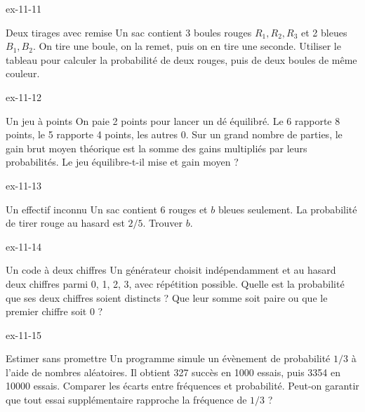 \clearpage{}
\begin{blocLivre}{ex-11-11}\begin{exercice}[3]{Deux tirages avec remise}
Un sac contient 3 boules rouges $R_1,R_2,R_3$ et 2 bleues $B_1,B_2$. On tire une boule, on la remet, puis on en tire une seconde. Utiliser le tableau pour calculer la probabilité de deux rouges, puis de deux boules de même couleur.
\label{fig-ex-11-11}
\end{exercice}\end{blocLivre}
\begin{blocLivre}{ex-11-12}\begin{exercice}[3]{Un jeu à points}
On paie 2 points pour lancer un dé équilibré. Le 6 rapporte 8 points, le 5 rapporte 4 points, les autres 0. Sur un grand nombre de parties, le gain brut moyen théorique est la somme des gains multipliés par leurs probabilités. Le jeu équilibre-t-il mise et gain moyen ?
\end{exercice}\end{blocLivre}
\begin{blocLivre}{ex-11-13}\begin{exercice}[3]{Un effectif inconnu}
Un sac contient 6 rouges et $b$ bleues seulement. La probabilité de tirer rouge au hasard est $2/5$. Trouver $b$.
\end{exercice}\end{blocLivre}
\begin{blocLivre}{ex-11-14}\begin{exercice}[3]{Un code à deux chiffres}
Un générateur choisit indépendamment et au hasard deux chiffres parmi 0, 1, 2, 3, avec répétition possible. Quelle est la probabilité que ses deux chiffres soient distincts ? Que leur somme soit paire ou que le premier chiffre soit 0 ?
\end{exercice}\end{blocLivre}
\begin{blocLivre}{ex-11-15}\begin{exercice}[3]{Estimer sans promettre}
Un programme simule un évènement de probabilité $1/3$ à l’aide de nombres aléatoires. Il obtient 327 succès en 1000 essais, puis 3354 en 10000 essais. Comparer les écarts entre fréquences et probabilité. Peut-on garantir que tout essai supplémentaire rapproche la fréquence de $1/3$ ?
\end{exercice}\end{blocLivre}

\clearpage
